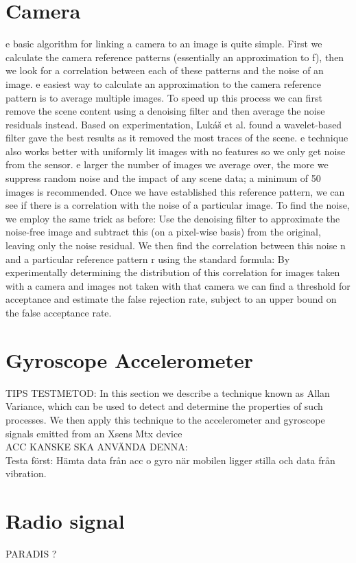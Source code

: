 \section{Camera}\label{sec:test:camera}
e basic algorithm for linking a camera to an image is quite simple. First we calculate the camera reference patterns (essentially an approximation to f), then we look for a correlation between each of these patterns and the noise of an image. e easiest way to calculate an approximation to the camera reference pattern is to average multiple images. To speed up this process we can first remove the scene content using a denoising filter and then average the noise residuals instead. Based on experimentation, Lukáš et al. found a wavelet-based filter gave the best results as it removed the most traces of the scene. e technique also works better with uniformly lit images with no features so we only get noise from the sensor. e larger the number of images we average over, the more we suppress random noise
and the impact of any scene data; a minimum of 50 images is recommended. Once we have established this reference pattern, we can see if there is a correlation with the noise of a particular image. To find the noise, we employ the same trick as before: Use the denoising filter to approximate the noise-free image and subtract this (on a pixel-wise basis) from the original, leaving only the noise residual. We then find the correlation between this noise n and a particular reference pattern r using the standard formula:
By experimentally determining the distribution of this correlation for images taken with a camera and images not taken with that camera we can find a threshold for acceptance and estimate the false rejection rate, subject to an upper bound on
the false acceptance rate. \cite[p.2]{sensor:camera:DCIdent}

\section{Gyroscope Accelerometer}\label{sec:test:gyro}
TIPS TESTMETOD: In this section we describe a technique known as Allan Variance, which can be used to detect and determine the properties of such processes. We then apply this technique to the accelerometer and gyroscope signals emitted from an Xsens Mtx device \cite{sensor:inertialNav} \\
ACC KANSKE SKA ANVÄNDA DENNA: \cite{sensor:micSpek} \\

Testa först:
Hämta data från acc o gyro när mobilen ligger stilla och data från vibration.

\section{Radio signal}\label{sec:test:rff}
PARADIS ?
